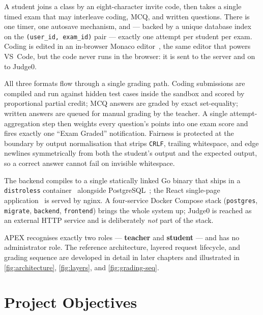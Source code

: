 \begin{description}[leftmargin=1.4em,style=nextline]
  \item[One attempt.] A student joins a class by an eight-character invite
  code, then takes a single timed exam that may interleave coding, MCQ, and
  written questions. There is one timer, one autosave mechanism, and --- backed
  by a unique database index on the \texttt{(user\_id, exam\_id)} pair ---
  exactly one attempt per student per exam. Coding is edited in an in-browser
  Monaco editor~\cite{monaco}, the same editor that powers VS~Code, but the
  code never runs in the browser: it is sent to the server and on to Judge0.
  \item[One pipeline.] All three formats flow through a single grading path.
  Coding submissions are compiled and run against hidden test cases inside the
  sandbox and scored by proportional partial credit; MCQ answers are graded by
  exact set-equality; written answers are queued for manual grading by the
  teacher. A single attempt-aggregation step then weights every question's
  points into one exam score and fires exactly one ``Exam Graded''
  notification. Fairness is protected at the boundary by output normalisation
  that strips \texttt{CRLF}, trailing whitespace, and edge newlines
  symmetrically from both the student's output and the expected output, so a
  correct answer cannot fail on invisible whitespace.
  \item[One artifact.] The backend compiles to a single statically linked Go
  binary that ships in a \texttt{distroless} container~\cite{distroless}
  alongside PostgreSQL~\cite{postgres}; the React single-page
  application~\cite{react,vite} is served by nginx. A four-service Docker
  Compose stack (\texttt{postgres}, \texttt{migrate}, \texttt{backend},
  \texttt{frontend}) brings the whole system up; Judge0 is reached as an
  external HTTP service and is deliberately \emph{not} part of the stack.
\end{description}

APEX recognises exactly two roles --- \textbf{teacher} and \textbf{student}
--- and has no administrator role. The reference architecture, layered request
lifecycle, and grading sequence are developed in detail in later chapters and
illustrated in \cref{fig:architecture}, \cref{fig:layers}, and
\cref{fig:grading-seq}.

\section{Project Objectives}

